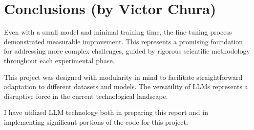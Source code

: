 \documentclass{cpsc202}
\begin{document}
    
    
    \section{Conclusions (by Victor Chura)}

    Even with a small model and minimal training time, the fine-tuning process demonstrated measurable improvement.
    This represents a promising foundation for addressing more complex challenges, guided by rigorous scientific methodology throughout each experimental phase.
    
    This project was designed with modularity in mind to facilitate straightforward adaptation to different datasets and models.
    The versatility of LLMs represents a disruptive force in the current technological landscape.
    
    I have utilized LLM technology both in preparing this report and in implementing significant portions of the code for this project.
\end{document}
